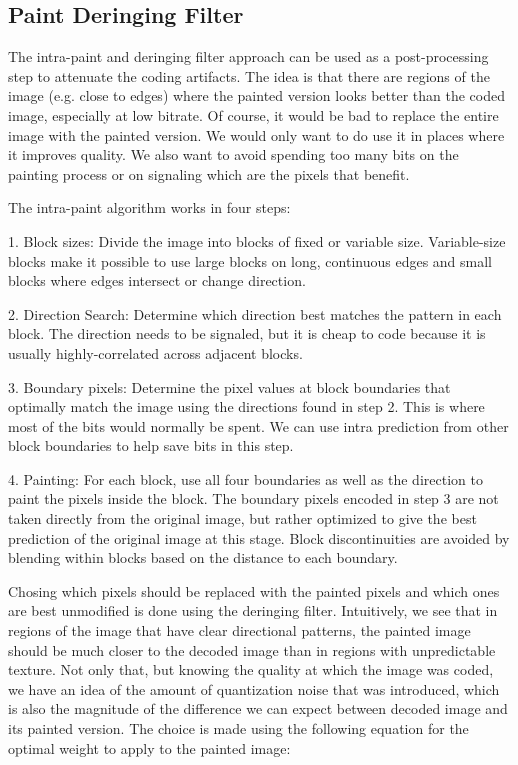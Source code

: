\documentclass[conference, 10pt]{IEEEtran}
\begin{document}
\subsection{Paint Deringing Filter}

The intra-paint and deringing filter approach can be used as a post-processing
 step to attenuate the coding artifacts. The idea is that there are regions of
 the image (e.g. close to edges) where the painted version looks better than
 the coded image, especially at low bitrate.
Of course, it would be bad to replace the entire image with the painted
 version.
We would only want to do use it in places where it improves quality.
We also want to avoid spending too many bits on the painting process or on
 signaling which are the pixels that benefit.

The intra-paint algorithm works in four steps:

1. Block sizes: Divide the image into blocks of fixed or variable size. Variable-size blocks make it possible to use large blocks on long, continuous edges and small blocks where edges intersect or change direction. 

2. Direction Search: Determine which direction best matches the pattern in each block. The direction needs to be signaled, but it is cheap to code because it is usually highly-correlated across adjacent blocks. 

3. Boundary pixels: Determine the pixel values at block boundaries that optimally match the image using the directions found in step 2. This is where most of the bits would normally be spent. We can use intra prediction from other block boundaries to help save bits in this step. 

4. Painting: For each block, use all four boundaries as well as the direction to paint the pixels inside the block. The boundary pixels encoded in step 3 are not taken directly from the original image, but rather optimized to give the best prediction of the original image at this stage. Block discontinuities are avoided by blending within blocks based on the distance to each boundary.


Chosing which pixels should be replaced with the painted pixels and which ones are best unmodified is done using the deringing filter. Intuitively, we see that in regions of the image that have clear directional patterns, the painted image should be much closer to the decoded image than in regions with unpredictable texture. Not only that, but knowing the quality at which the image was coded, we have an idea of the amount of quantization noise that was introduced, which is also the magnitude of the difference we can expect between decoded image and its painted version. The choice is made using the following equation for the optimal weight to apply to the painted image:
\end{document}

